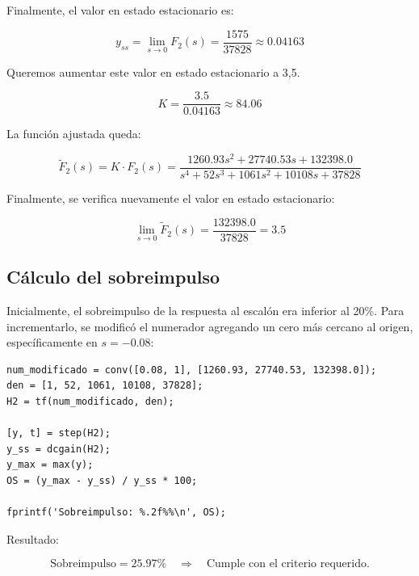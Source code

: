 \documentclass[11pt,letterpaper]{article}
\begin{document}
Finalmente, el valor en estado estacionario es:

\begin{equation}
y_{ss} = \lim_{s \to 0} F_2(s) = \frac{1575}{37828} \approx 0.04163
\end{equation}

Queremos aumentar este valor en estado estacionario a 3,5.

\begin{equation}
K = \frac{3.5}{0.04163} \approx 84.06
\end{equation}

La función ajustada queda:

\begin{equation}
\tilde{F}_2(s) = K \cdot F_2(s) = \frac{1260.93 s^2 + 27740.53 s + 132398.0}{s^4 + 52s^3 + 1061s^2 + 10108s + 37828}
\end{equation}

Finalmente, se verifica nuevamente el valor en estado estacionario:

\begin{equation}
\lim_{s \to 0} \tilde{F}_2(s) = \frac{132398.0}{37828} = \boxed{3.5}
\end{equation}

\subsection{Cálculo del sobreimpulso}

Inicialmente, el sobreimpulso de la respuesta al escalón era inferior al 20\%. Para incrementarlo, se modificó el numerador agregando un cero más cercano al origen, específicamente en $s = -0.08$:

\begin{lstlisting}[caption={Modificación del numerador para ajustar sobreimpulso}]
num_modificado = conv([0.08, 1], [1260.93, 27740.53, 132398.0]);
den = [1, 52, 1061, 10108, 37828];
H2 = tf(num_modificado, den);

[y, t] = step(H2);
y_ss = dcgain(H2);
y_max = max(y);
OS = (y_max - y_ss) / y_ss * 100;

fprintf('Sobreimpulso: %.2f%%\n', OS);
\end{lstlisting}

Resultado:

\begin{equation}
\text{Sobreimpulso} = 25.97\% \quad \Rightarrow \quad \text{Cumple con el criterio requerido.}
\end{equation}
\end{document}
